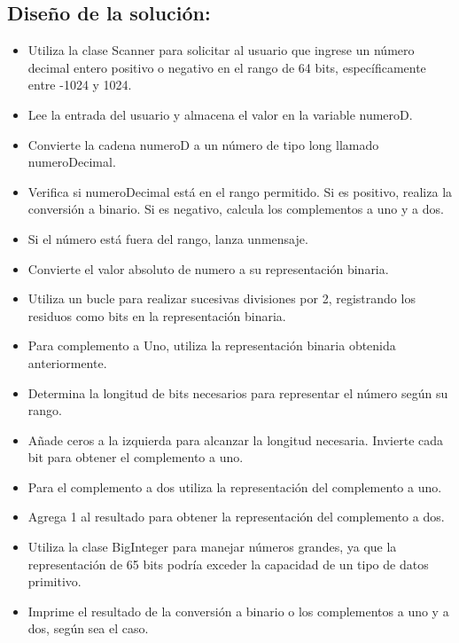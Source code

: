 \subsection{\textbf{Diseño de la solución:}}
\begin{itemize}
    \item Utiliza la clase Scanner para solicitar al usuario que ingrese un número decimal entero positivo o negativo en el rango de 64 bits, específicamente entre -1024 y 1024.
    \item Lee la entrada del usuario y almacena el valor en la variable numeroD.
    
    \item Convierte la cadena numeroD a un número de tipo long llamado numeroDecimal.
    \item Verifica si numeroDecimal está en el rango permitido. Si es positivo, realiza la conversión a binario. Si es negativo, calcula los complementos a uno y a dos.
    \item Si el número está fuera del rango, lanza unmensaje.
    
    \item Convierte el valor absoluto de numero a su representación binaria.
    \item Utiliza un bucle para realizar sucesivas divisiones por 2, registrando los residuos como bits en la representación binaria.
    
    \item Para complemento a Uno, utiliza la representación binaria obtenida anteriormente.
    
    \item Determina la longitud de bits necesarios para representar el número según su rango.
    
    \item Añade ceros a la izquierda para alcanzar la longitud necesaria.
    Invierte cada bit para obtener el complemento a uno.
    
    \item Para el complemento a dos utiliza la representación del complemento a uno.
    
    \item Agrega 1 al resultado para obtener la representación del complemento a dos.
    
    \item Utiliza la clase BigInteger para manejar números grandes, ya que la representación de 65 bits podría exceder la capacidad de un tipo de datos primitivo.
    
    \item Imprime el resultado de la conversión a binario o los complementos a uno y a dos, según sea el caso.
    \end{itemize}

